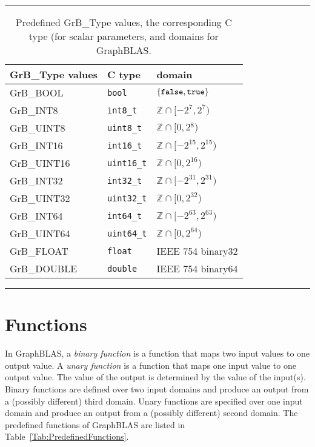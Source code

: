 \begin{table}
\hrule
\begin{center}
\caption{Predefined {\sf GrB\_Type} values, the corresponding C type (for scalar
parameters, and domains for GraphBLAS. 
        }
\label{Tab:PredefinedTypes}
\begin{tabular}{l|l|l}
{\sf GrB\_Type values} & C type            & domain \\
\hline
{\sf GrB\_BOOL}        & {\tt bool}        & $\{ {\tt false}, {\tt true} \}$  \\
{\sf GrB\_INT8}        & {\tt int8\_t}     & $\mathbb{Z} \cap [-2^{7},2^{7})$  \\
{\sf GrB\_UINT8}       & {\tt uint8\_t}    & $\mathbb{Z} \cap [0,2{^8})$  \\
{\sf GrB\_INT16}       & {\tt int16\_t}    & $\mathbb{Z} \cap [-2^{15},2^{15})$ \\
{\sf GrB\_UINT16}      & {\tt uint16\_t}   & $\mathbb{Z} \cap [0,2^{16})$ \\
{\sf GrB\_INT32}       & {\tt int32\_t}    & $\mathbb{Z} \cap [-2^{31},2^{31})$ \\
{\sf GrB\_UINT32}      & {\tt uint32\_t}   & $\mathbb{Z} \cap [0,2^{32})$ \\
{\sf GrB\_INT64}       & {\tt int64\_t}    & $\mathbb{Z} \cap [-2^{63},2^{63})$ \\
{\sf GrB\_UINT64}      & {\tt uint64\_t}   & $\mathbb{Z} \cap [0,2^{64})$ \\
{\sf GrB\_FLOAT}       & {\tt float}       & IEEE 754 {\sf binary32}  \\
{\sf GrB\_DOUBLE}      & {\tt double}      & IEEE 754 {\sf binary64}  \\
\end{tabular}
\end{center}
\hrule
\end{table}

\section{Functions}

In GraphBLAS, a \emph{binary function} is a function that maps two input
values to one output value. A \emph{unary function} is a function that 
maps one input value to one output value. The value of the output is 
determined by the value of the input(s).  Binary functions are defined over 
two input domains and produce an output from a (possibly different) third 
domain. Unary functions are specified over one input domain and produce an 
output from a (possibly different) second domain.  The predefined functions 
of GraphBLAS are listed in Table~\ref{Tab:PredefinedFunctions}.

